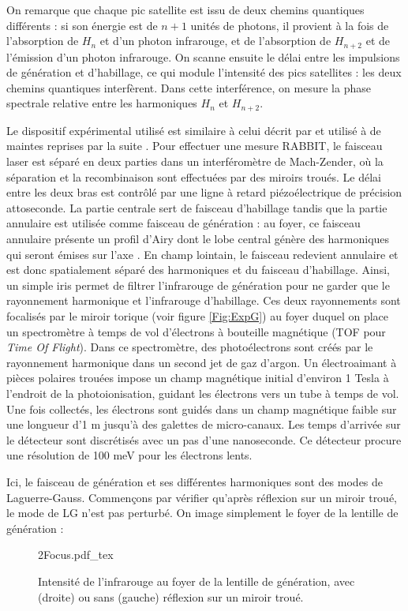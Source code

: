 On remarque que chaque pic satellite est issu de deux chemins quantiques différents : si son énergie est de $n+1$ unités de photons, il provient à la fois de l'absorption de $H_{n}$ et d'un photon infrarouge, et de l'absorption de $H_{n+2}$ et de l'émission d'un photon infrarouge. On scanne ensuite le délai entre les impulsions de génération et d'habillage, ce qui module l'intensité des pics satellites : les deux chemins quantiques interfèrent. Dans cette interférence, on mesure la phase spectrale relative entre les harmoniques $H_{n}$ et $H_{n+2}$.

Le dispositif expérimental utilisé est similaire à celui décrit par  et utilisé à de maintes reprises par la suite . Pour effectuer une mesure RABBIT, le faisceau laser est séparé en deux parties dans un interféromètre de Mach-Zender, où la séparation et la recombinaison sont effectuées par des miroirs troués. Le délai entre les deux bras est contrôlé par une ligne à retard piézoélectrique de précision attoseconde. La partie centrale sert de faisceau d'habillage tandis que la partie annulaire est utilisée comme faisceau de génération : au foyer, ce faisceau annulaire présente un profil d'Airy dont le lobe central génère des harmoniques qui seront émises sur l'axe . En champ lointain, le faisceau redevient annulaire et est donc spatialement séparé des harmoniques et du faisceau d'habillage. Ainsi, un simple iris permet de filtrer l'infrarouge de génération pour ne garder que le rayonnement harmonique et l'infrarouge d'habillage. Ces deux rayonnements sont focalisés par le miroir torique (voir figure \ref{Fig:ExpG}) au foyer duquel on place un spectromètre à temps de vol d'électrons à bouteille magnétique (TOF pour \textit{Time Of Flight}). Dans ce spectromètre, des photoélectrons sont créés par le rayonnement harmonique dans un second jet de gaz d'argon. Un électroaimant à pièces polaires trouées impose un champ magnétique initial d’environ 1 Tesla à l’endroit de la photoionisation, guidant les électrons vers un tube à temps de vol. Une fois collectés, les électrons sont guidés dans un champ magnétique faible sur une longueur d’1 m jusqu'à des galettes de micro-canaux. Les temps d’arrivée sur le détecteur sont discrétisés avec un pas d’une nanoseconde. Ce détecteur procure une résolution de 100 meV pour les électrons lents. 

Ici, le faisceau de génération et ses différentes harmoniques sont des modes de Laguerre-Gauss. Commençons par vérifier qu'après réflexion sur un miroir troué, le mode de LG n'est pas perturbé. On image simplement le foyer de la lentille de génération :
%
\begin{figure}[!ht]
\centering
\def\svgwidth{.7\columnwidth}
{2Focus.pdf_tex}
\caption{Intensité de l'infrarouge au foyer de la lentille de génération, avec (droite) ou sans (gauche) réflexion sur un miroir troué.}
\label{Fig:2focus}
\end{figure}

